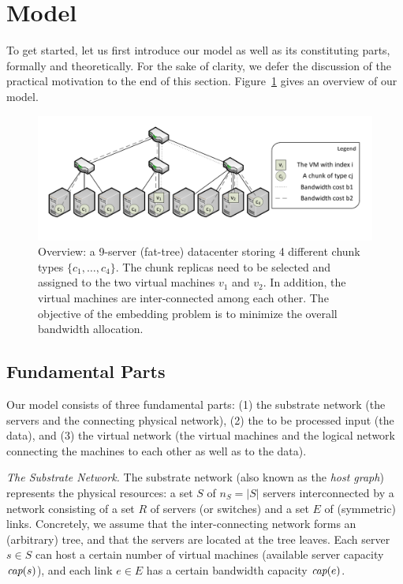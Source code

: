 \documentclass[9pt]{sigcomm-alternate}
\newcommand{\capacity}{\emph{cap}}
\begin{document}
\section{Model}\label{sec:model}

To get started, let us first introduce our model as well as its constituting parts, formally and theoretically.
For the sake of clarity, we defer the discussion of the practical motivation 
to the end of this section. Figure~\ref{fig:overview} gives an overview of our model.

\begin{figure}[t]
\centering
\includegraphics[width=0.99\columnwidth]{figs/overview-fig.pdf}
\caption{Overview: a 9-server (fat-tree) datacenter storing 4 different chunk
types $\{c_1,\ldots,c_4\}$. The chunk replicas need to be selected and assigned to the two
 virtual machines $v_1$ and $v_2$. In addition, the virtual machines are inter-connected among
 each other. The objective of the embedding problem is to minimize the overall bandwidth allocation.}
\label{fig:overview}
\end{figure}



\subsection{Fundamental Parts}

Our model consists of three fundamental parts: (1) the substrate network (the servers
and the connecting physical network),
(2) the to be processed input (the data), and
(3) the virtual network (the virtual machines and the logical network connecting the machines to each other
as well as to the data).

\emph{The Substrate Network.} The substrate network (also known as the \emph{host graph}) represents the physical resources:
a set $S$ of $n_S=|S|$ servers interconnected by a network consisting of a set $R$ of servers (or switches)
and a set $E$ of (symmetric) links. Concretely, we assume that the inter-connecting network forms an (arbitrary) tree,
and that the servers are located at the tree leaves.
Each server $s\in S$ can host a certain number
of virtual machines (available server capacity $\capacity(s)$), and each link $e\in E$ has a certain bandwidth
capacity $\capacity(e)$.
\end{document}
